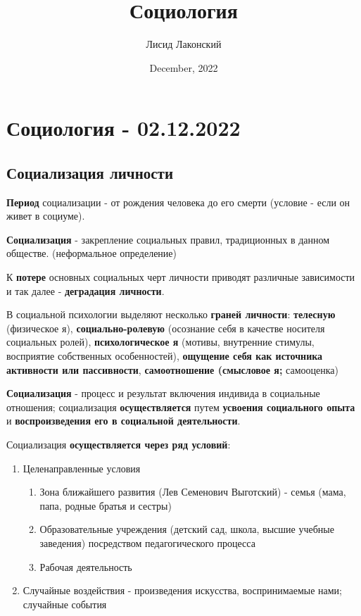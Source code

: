 \documentclass{article}
\title{Социология}
\author{Лисид Лаконский}
\date{December, 2022}
\begin{document}
\maketitle
\tableofcontents
\pagebreak

\section{Социология - 02.12.2022}

\subsection{Социализация личности}

\begin{flushleft}

\textbf{Период} социализации - от рождения человека до его смерти (условие - если он живет в социуме).

\textbf{Социализация} - закрепление социальных правил, традиционных в данном обществе. (неформальное определение)

К \textbf{потере} основных социальных черт личности приводят различные зависимости и так далее - \textbf{деградация личности}.

\hfill

В социальной психологии выделяют несколько \textbf{граней личности}: \textbf{телесную} (физическое я), \textbf{социально-ролевую} (осознание себя в качестве носителя социальных ролей), \textbf{психологическое я} (мотивы, внутренние стимулы, восприятие собственных особенностей), \textbf{ощущение себя как источника активности или пассивности}, \textbf{самоотношение (смысловое я;} самооценка)

\textbf{Социализация} - процесс и результат включения индивида в социальные отношения; социализация \textbf{осуществляется} путем \textbf{усвоения социального опыта} и \textbf{воспроизведения его в социальной деятельности}. 

\hfill

Социализация \textbf{осуществляется через ряд условий}:

\begin{enumerate}
    \item Целенаправленные условия
    \begin{enumerate}
        \item Зона ближайшего развития (Лев Семенович Выготский) - семья (мама, папа, родные братья и сестры)
        \item Образовательные учреждения (детский сад, школа, высшие учебные заведения) посредством педагогического процесса
        \item Рабочая деятельность
    \end{enumerate}
    \item Случайные воздействия - произведения искусства, воспринимаемые нами; случайные события
\end{enumerate}


\end{flushleft}
\end{document}
